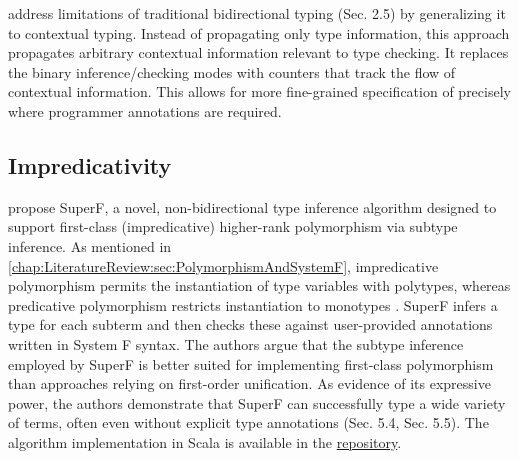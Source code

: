 \citeauthor{xue-contextual-2024} \cite{xue-contextual-2024} address limitations of traditional bidirectional typing (Sec. 2.5) by generalizing it to contextual typing. Instead of propagating only type information, this approach propagates arbitrary contextual information relevant to type checking. It replaces the binary inference/checking modes with counters that track the flow of contextual information. This allows for more fine-grained specification of precisely where programmer annotations are required.

\subsection{Impredicativity}

\citeauthor{parreaux-when-2024} \cite{parreaux-when-2024} propose SuperF, a novel, non-bidirectional type inference algorithm designed to support first-class (impredicative) higher-rank polymorphism via subtype inference. As mentioned in \cref{chap:LiteratureReview:sec:PolymorphismAndSystemF}, impredicative polymorphism permits the instantiation of type variables with polytypes, whereas predicative polymorphism restricts instantiation to monotypes \cite[Sec. 3.4]{jones-practical-2007}. SuperF infers a type for each subterm and then checks these against user-provided annotations written in System F syntax. The authors argue that the subtype inference employed by SuperF is better suited for implementing first-class polymorphism than approaches relying on first-order unification. As evidence of its expressive power, the authors demonstrate that SuperF can successfully type a wide variety of terms, often even without explicit type annotations (Sec. 5.4, Sec. 5.5). The algorithm implementation in Scala is available in the \href{https://github.com/hkust-taco/superf}{repository}.